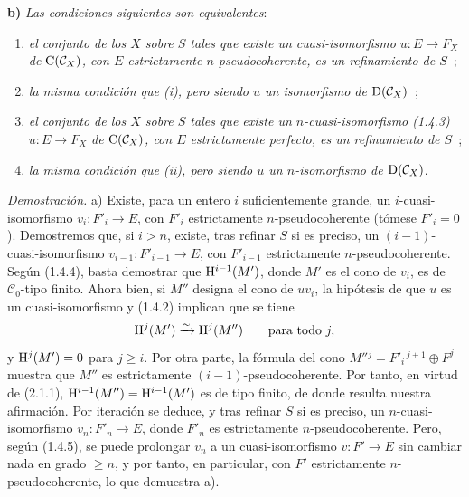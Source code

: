 \textbf{b)} \emph{Las condiciones siguientes son equivalentes}:
\begin{enumerate}[label=(\roman*)]
\item \emph{el conjunto de los \(X\) sobre \(S\) tales que existe un cuasi-isomorfismo \(u:E\longrightarrow F_X\) de \(\mathrm C(\mathcal C_X)\), con \(E\) estrictamente \(n\)-pseudocoherente, es un refinamiento de \(S\)}~;
\item[\((\mathrm{i}')\)] \emph{la misma condición que (i), pero siendo \(u\) un isomorfismo de \(\mathrm D(\mathcal C_X)\)}~;
\item \emph{el conjunto de los \(X\) sobre \(S\) tales que existe un \(n\)-cuasi-isomorfismo (1.4.3) \(u:E\longrightarrow F_X\) de \(\mathrm C(\mathcal C_X)\), con \(E\) estrictamente perfecto, es un refinamiento de \(S\)}~;
\item[\((\mathrm{ii}')\)] \emph{la misma condición que (ii), pero siendo \(u\) un \(n\)-isomorfismo de \(\mathrm D(\mathcal C_X)\)}.
\end{enumerate}

\emph{Demostración.} a) Existe, para un entero \(i\) suficientemente grande, un \(i\)-cuasi-isomorfismo \(v_i:F'_i\longrightarrow E\), con \(F'_i\) estrictamente \(n\)-pseudocoherente (tómese \(F'_i=0\)). Demostremos que, si \(i>n\), existe, tras refinar \(S\) si es preciso, un \((i-1)\)-cuasi-isomorfismo \(v_{i-1}:F'_{i-1}\longrightarrow E\), con \(F'_{i-1}\) estrictamente \(n\)-pseudocoherente. Según (1.4.4), basta demostrar que \(\mathrm H^{i-1}(M')\), donde \(M'\) es el cono de \(v_i\), es de \(\mathcal C_0\)-tipo finito. Ahora bien, si \(M''\) designa el cono de \(uv_i\), la hipótesis de que \(u\) es un cuasi-isomorfismo y (1.4.2) implican que se tiene
\[
  \mathrm H^j(M')\xrightarrow{\sim} \mathrm H^j(M'')\qquad\text{para todo }j,
\]
y \(\mathrm H^j(M')=0\) para \(j\geq i\).
Por otra parte, la fórmula del cono \(M''{}^j=F'_i{}^{\,j+1}\oplus F^j\) muestra que \(M''\) es estrictamente \((i-1)\)-pseudocoherente. Por tanto, en virtud de (2.1.1), \(\mathrm H^{i-1}(M'')=\mathrm H^{i-1}(M')\) es de tipo finito, de donde resulta nuestra afirmación. Por iteración se deduce, y tras refinar \(S\) si es preciso, un \(n\)-cuasi-isomorfismo \(v_n:F'_n\longrightarrow E\), donde \(F'_n\) es estrictamente \(n\)-pseudocoherente. Pero, según (1.4.5), se puede prolongar \(v_n\) a un cuasi-isomorfismo \(v:F'\longrightarrow E\) sin cambiar nada en grado \(\geq n\), y por tanto, en particular, con \(F'\) estrictamente \(n\)-pseudocoherente, lo que demuestra a).

